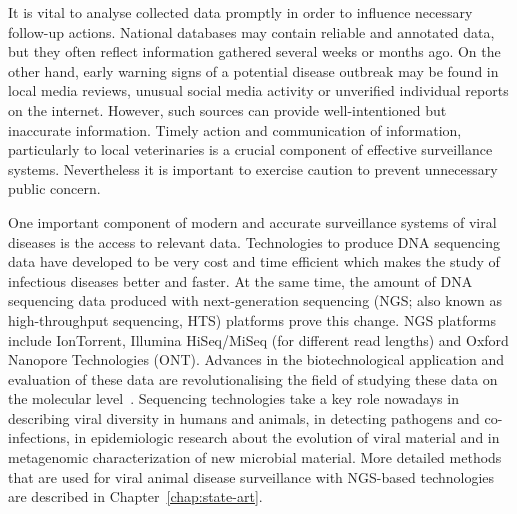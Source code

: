 It is vital to analyse collected data promptly in order to influence necessary follow-up actions. National databases may contain reliable and annotated data, but they often reflect information gathered several weeks or months ago. On the other hand, early warning signs of a potential disease outbreak may be found in local media reviews, unusual social media activity or unverified individual reports on the internet. However, such sources can provide well-intentioned but inaccurate information. Timely action and communication of information, particularly to local veterinaries is a crucial component of effective surveillance systems. Nevertheless it is important to exercise caution to prevent unnecessary public concern.

One important component of modern and accurate surveillance systems of viral diseases is the access to relevant data. Technologies to produce DNA sequencing data have developed to be very cost and time efficient which makes the study of infectious diseases better and faster. At the same time, the amount of DNA sequencing data produced with next-generation sequencing (NGS; also known as high-throughput sequencing, HTS) platforms prove this change. NGS platforms include IonTorrent, Illumina HiSeq/MiSeq (for different read lengths) and Oxford Nanopore Technologies (ONT). Advances in the biotechnological application and evaluation of these data are revolutionalising the field of studying these data on the molecular level~\cite{suminda2022high}. Sequencing technologies take a key role nowadays in describing viral diversity in humans and animals, in detecting pathogens and co-infections, in epidemiologic research about the evolution of viral material and in metagenomic characterization of new microbial material. More detailed methods that are used for viral animal disease surveillance with NGS-based technologies are described in Chapter~\ref{chap:state-art}.

